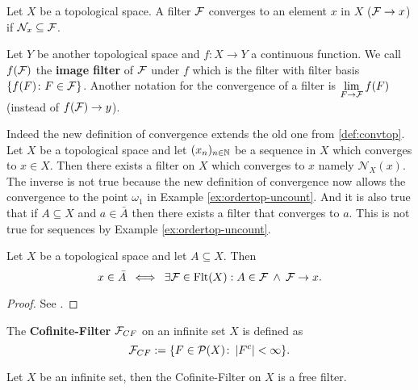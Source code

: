 \begin{defin}
  Let $X$ be a topological space. A filter $\mathcal{F}$ converges to an element $x$ in $X$ ($\mathcal{F} \to x$) if $\mathcal{N}_x \subseteq \mathcal{F}$. 
  
  Let $Y$ be another topological space and $f: X \to Y$ a continuous function. 
  We call $f(\mathcal{F})$ the \textbf{image filter} of $\mathcal{F}$ under $f$ which is the filter with filter basis $\{f(F)\colon F \in \mathcal{F}\}$. Another notation for the convergence of a filter is $\lim\limits_{F\to\mathcal{F}}f(F)$ (instead of $f(\mathcal{F}) \to y$).
\end{defin}

Indeed the new definition of convergence extends the old one from \ref{def:convtop}. Let $X$ be a topological space and let $(x_n)_{n\in\mathbb{N}}$ be a sequence in $X$ which converges to $x \in X$. Then there exists a filter on $X$ which converges to $x$ namely $\mathcal{N}_X(x)$. The inverse is not true because the new definition of convergence now allows the convergence to the point $\omega_1$ in Example \ref{ex:ordertop-uncount}. And it is also true that if $A \subseteq X$ and $a \in \bar{A}$ then there exists a filter that converges to $a$. This is not true for sequences by Example \ref{ex:ordertop-uncount}.

\begin{thm}\label{thm:fcl}
  Let $X$ be a topological space and let $A \subseteq X$. Then
  \begin{equation*}
    x \in \bar{A} \: \iff \: \exists \mathcal{F} \in {\rm Flt}(X): A \in \mathcal{F} \: \land \: \mathcal{F} \to x.
  \end{equation*}
\end{thm}

\begin{proof}
  See \cite[5.17 Satz]{BvQMT}.
\end{proof}

\begin{defin}
  The \textbf{Cofinite-Filter} $\mathcal{F}_{CF}$ on an infinite set $X$ is defined as 
  \begin{equation*}
    \mathcal{F}_{CF} := \{ F \in \mathcal{P}(X)\colon \left| F^c \right| < \infty\}.\qedhere
  \end{equation*}
\end{defin}

\begin{lemma}\label{lem:coffil}
  Let $X$ be an infinite set, then the Cofinite-Filter on $X$ is a free filter.
\end{lemma}

